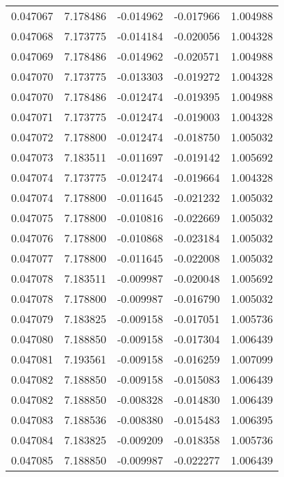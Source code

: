 \begin{tabular}{lrrrr}
0.047067    &  7.178486 & -0.014962 & -0.017966 &             1.004988 \\
0.047068    &  7.173775 & -0.014184 & -0.020056 &             1.004328 \\
0.047069    &  7.178486 & -0.014962 & -0.020571 &             1.004988 \\
0.047070    &  7.173775 & -0.013303 & -0.019272 &             1.004328 \\
0.047070    &  7.178486 & -0.012474 & -0.019395 &             1.004988 \\
0.047071    &  7.173775 & -0.012474 & -0.019003 &             1.004328 \\
0.047072    &  7.178800 & -0.012474 & -0.018750 &             1.005032 \\
0.047073    &  7.183511 & -0.011697 & -0.019142 &             1.005692 \\
0.047074    &  7.173775 & -0.012474 & -0.019664 &             1.004328 \\
0.047074    &  7.178800 & -0.011645 & -0.021232 &             1.005032 \\
0.047075    &  7.178800 & -0.010816 & -0.022669 &             1.005032 \\
0.047076    &  7.178800 & -0.010868 & -0.023184 &             1.005032 \\
0.047077    &  7.178800 & -0.011645 & -0.022008 &             1.005032 \\
0.047078    &  7.183511 & -0.009987 & -0.020048 &             1.005692 \\
0.047078    &  7.178800 & -0.009987 & -0.016790 &             1.005032 \\
0.047079    &  7.183825 & -0.009158 & -0.017051 &             1.005736 \\
0.047080    &  7.188850 & -0.009158 & -0.017304 &             1.006439 \\
0.047081    &  7.193561 & -0.009158 & -0.016259 &             1.007099 \\
0.047082    &  7.188850 & -0.009158 & -0.015083 &             1.006439 \\
0.047082    &  7.188850 & -0.008328 & -0.014830 &             1.006439 \\
0.047083    &  7.188536 & -0.008380 & -0.015483 &             1.006395 \\
0.047084    &  7.183825 & -0.009209 & -0.018358 &             1.005736 \\
0.047085    &  7.188850 & -0.009987 & -0.022277 &             1.006439 \\

\end{tabular}
